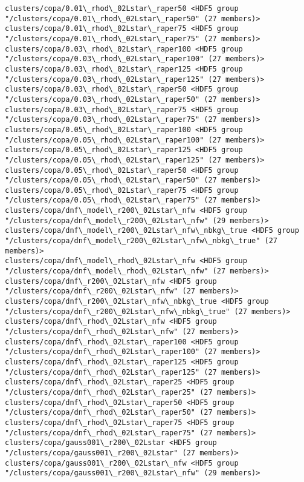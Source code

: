 \documentclass[11pt]{article}
\begin{document}
\begin{Verbatim}[commandchars=\\\{\}]
clusters/copa/0.01\_rhod\_02Lstar\_raper50 <HDF5 group "/clusters/copa/0.01\_rhod\_02Lstar\_raper50" (27 members)>
clusters/copa/0.01\_rhod\_02Lstar\_raper75 <HDF5 group "/clusters/copa/0.01\_rhod\_02Lstar\_raper75" (27 members)>
clusters/copa/0.03\_rhod\_02Lstar\_raper100 <HDF5 group "/clusters/copa/0.03\_rhod\_02Lstar\_raper100" (27 members)>
clusters/copa/0.03\_rhod\_02Lstar\_raper125 <HDF5 group "/clusters/copa/0.03\_rhod\_02Lstar\_raper125" (27 members)>
clusters/copa/0.03\_rhod\_02Lstar\_raper50 <HDF5 group "/clusters/copa/0.03\_rhod\_02Lstar\_raper50" (27 members)>
clusters/copa/0.03\_rhod\_02Lstar\_raper75 <HDF5 group "/clusters/copa/0.03\_rhod\_02Lstar\_raper75" (27 members)>
clusters/copa/0.05\_rhod\_02Lstar\_raper100 <HDF5 group "/clusters/copa/0.05\_rhod\_02Lstar\_raper100" (27 members)>
clusters/copa/0.05\_rhod\_02Lstar\_raper125 <HDF5 group "/clusters/copa/0.05\_rhod\_02Lstar\_raper125" (27 members)>
clusters/copa/0.05\_rhod\_02Lstar\_raper50 <HDF5 group "/clusters/copa/0.05\_rhod\_02Lstar\_raper50" (27 members)>
clusters/copa/0.05\_rhod\_02Lstar\_raper75 <HDF5 group "/clusters/copa/0.05\_rhod\_02Lstar\_raper75" (27 members)>
clusters/copa/dnf\_model\_r200\_02Lstar\_nfw <HDF5 group "/clusters/copa/dnf\_model\_r200\_02Lstar\_nfw" (29 members)>
clusters/copa/dnf\_model\_r200\_02Lstar\_nfw\_nbkg\_true <HDF5 group "/clusters/copa/dnf\_model\_r200\_02Lstar\_nfw\_nbkg\_true" (27 members)>
clusters/copa/dnf\_model\_rhod\_02Lstar\_nfw <HDF5 group "/clusters/copa/dnf\_model\_rhod\_02Lstar\_nfw" (27 members)>
clusters/copa/dnf\_r200\_02Lstar\_nfw <HDF5 group "/clusters/copa/dnf\_r200\_02Lstar\_nfw" (27 members)>
clusters/copa/dnf\_r200\_02Lstar\_nfw\_nbkg\_true <HDF5 group "/clusters/copa/dnf\_r200\_02Lstar\_nfw\_nbkg\_true" (27 members)>
clusters/copa/dnf\_rhod\_02Lstar\_nfw <HDF5 group "/clusters/copa/dnf\_rhod\_02Lstar\_nfw" (27 members)>
clusters/copa/dnf\_rhod\_02Lstar\_raper100 <HDF5 group "/clusters/copa/dnf\_rhod\_02Lstar\_raper100" (27 members)>
clusters/copa/dnf\_rhod\_02Lstar\_raper125 <HDF5 group "/clusters/copa/dnf\_rhod\_02Lstar\_raper125" (27 members)>
clusters/copa/dnf\_rhod\_02Lstar\_raper25 <HDF5 group "/clusters/copa/dnf\_rhod\_02Lstar\_raper25" (27 members)>
clusters/copa/dnf\_rhod\_02Lstar\_raper50 <HDF5 group "/clusters/copa/dnf\_rhod\_02Lstar\_raper50" (27 members)>
clusters/copa/dnf\_rhod\_02Lstar\_raper75 <HDF5 group "/clusters/copa/dnf\_rhod\_02Lstar\_raper75" (27 members)>
clusters/copa/gauss001\_r200\_02Lstar <HDF5 group "/clusters/copa/gauss001\_r200\_02Lstar" (27 members)>
clusters/copa/gauss001\_r200\_02Lstar\_nfw <HDF5 group "/clusters/copa/gauss001\_r200\_02Lstar\_nfw" (29 members)>

\end{Verbatim}
\end{document}
